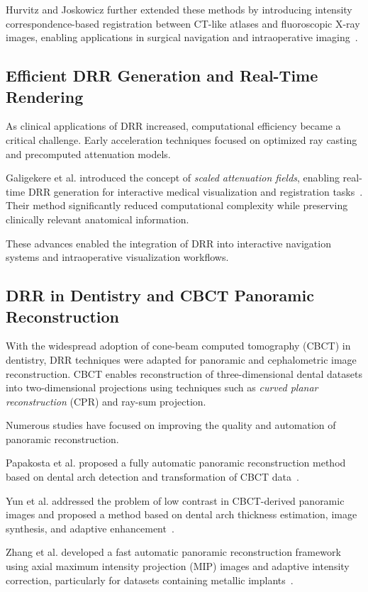 \documentclass[11pt,a4paper]{article}
\begin{document}
Hurvitz and Joskowicz further extended these methods by introducing intensity correspondence-based registration between CT-like atlases and fluoroscopic X-ray images, enabling applications in surgical navigation and intraoperative imaging~\cite{Hurvitz2008}.

\subsection{Efficient DRR Generation and Real-Time Rendering}

As clinical applications of DRR increased, computational efficiency became a critical challenge. Early acceleration techniques focused on optimized ray casting and precomputed attenuation models.

Galigekere et al. introduced the concept of \textit{scaled attenuation fields}, enabling real-time DRR generation for interactive medical visualization and registration tasks~\cite{Galigekere2003}. Their method significantly reduced computational complexity while preserving clinically relevant anatomical information.

These advances enabled the integration of DRR into interactive navigation systems and intraoperative visualization workflows.

\subsection{DRR in Dentistry and CBCT Panoramic Reconstruction}

With the widespread adoption of cone-beam computed tomography (CBCT) in dentistry, DRR techniques were adapted for panoramic and cephalometric image reconstruction. CBCT enables reconstruction of three-dimensional dental datasets into two-dimensional projections using techniques such as \textit{curved planar reconstruction} (CPR) and ray-sum projection.

Numerous studies have focused on improving the quality and automation of panoramic reconstruction.

Papakosta et al. proposed a fully automatic panoramic reconstruction method based on dental arch detection and transformation of CBCT data~\cite{Papakosta2017}.

Yun et al. addressed the problem of low contrast in CBCT-derived panoramic images and proposed a method based on dental arch thickness estimation, image synthesis, and adaptive enhancement~\cite{YUN2019205}.

Zhang et al. developed a fast automatic panoramic reconstruction framework using axial maximum intensity projection (MIP) images and adaptive intensity correction, particularly for datasets containing metallic implants~\cite{electronics11152404}.
\end{document}

